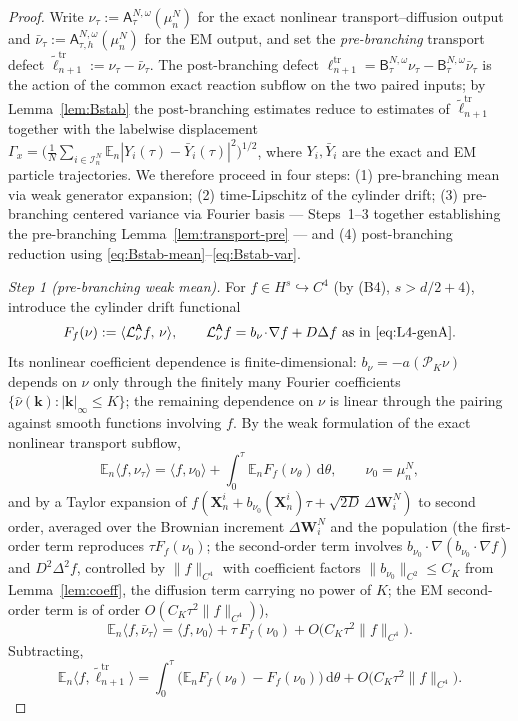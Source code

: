 \documentclass[a4paper,fleqn]{cas-sc}
\theoremstyle{definition}
\theoremstyle{remark}
\begin{document}
\begin{proof}
Write $\nu_\tau:=\mathsf A^{N,\omega}_\tau(\mu^N_n)$ for the exact nonlinear
transport--diffusion output and $\bar\nu_\tau:=\mathsf A^{N,\omega}_{\tau,h}(\mu^N_n)$
for the EM output, and set the \emph{pre-branching} transport defect
$\widetilde\ell^{\mathrm{tr}}_{n+1}:=\nu_\tau-\bar\nu_\tau$. The post-branching defect
$\ell^{\mathrm{tr}}_{n+1}=\mathsf B^{N,\omega}_\tau\nu_\tau
-\mathsf B^{N,\omega}_\tau\bar\nu_\tau$ is the action of the common exact reaction
subflow on the two paired inputs; by Lemma~\ref{lem:Bstab} the post-branching
estimates reduce to estimates of $\widetilde\ell^{\mathrm{tr}}_{n+1}$ together with the
labelwise displacement
$\Gamma_x=\bigl(\frac1N\sum_{i\in\mathcal I^N_n}\mathbb E_n|Y_i(\tau)-\bar Y_i(\tau)|^2\bigr)^{1/2}$,
where $Y_i,\bar Y_i$ are the exact and EM particle trajectories. We therefore
proceed in four steps: (1) pre-branching mean via weak generator expansion;
(2) time-Lipschitz of the cylinder drift; (3) pre-branching centered variance
via Fourier basis --- Steps~1--3 together establishing the pre-branching
Lemma~\ref{lem:transport-pre} --- and (4) post-branching reduction using
\eqref{eq:Bstab-mean}--\eqref{eq:Bstab-var}.

\emph{Step 1 (pre-branching weak mean).} For $f\in H^s\hookrightarrow C^4$ (by
(B4), $s>d/2+4$), introduce the cylinder drift functional
\[
F_f(\nu):=\langle \mathcal L^{\mathsf A}_\nu f,\,\nu\rangle,\qquad
\mathcal L^{\mathsf A}_\nu f=b_\nu\!\cdot\!\nabla f+D\Delta f\ \text{as in~\eqref{eq:L4-genA}.}
\]
Its nonlinear coefficient dependence is finite-dimensional: $b_\nu=-a(\mathcal P_K\nu)$
depends on $\nu$ only through the finitely many Fourier coefficients
$\{\hat\nu(\mathbf k):|\mathbf k|_\infty\le K\}$; the remaining dependence on
$\nu$ is linear through the pairing against smooth functions involving $f$. By
the weak formulation of the exact nonlinear transport subflow,
\[
\mathbb E_n\langle f,\nu_\tau\rangle=\langle f,\nu_0\rangle
+\int_0^\tau\mathbb E_nF_f(\nu_\theta)\,\mathrm d\theta,
\qquad\nu_0=\mu^N_n,
\]
and by a Taylor expansion of $f(\mathbf X^i_n+b_{\nu_0}(\mathbf X^i_n)\tau
+\sqrt{2D}\,\Delta\mathbf W^N_i)$ to second order, averaged over the Brownian
increment $\Delta\mathbf W^N_i$ and the population (the first-order term
reproduces $\tau F_f(\nu_0)$; the second-order term involves
$b_{\nu_0}\!\cdot\!\nabla(b_{\nu_0}\!\cdot\!\nabla f)$ and $D^2\Delta^2 f$,
controlled by $\|f\|_{C^4}$ with coefficient factors $\|b_{\nu_0}\|_{C^2}\le C_K$
from Lemma~\ref{lem:coeff}, the diffusion term carrying no power of $K$; the EM
second-order term is of order $O(C_K\tau^2\|f\|_{C^4})$),
\[
\mathbb E_n\langle f,\bar\nu_\tau\rangle=\langle f,\nu_0\rangle+\tau\,F_f(\nu_0)
+O\bigl(C_K\tau^2\|f\|_{C^4}\bigr).
\]
Subtracting,
\[
\mathbb E_n\langle f,\widetilde\ell^{\mathrm{tr}}_{n+1}\rangle
=\int_0^\tau\bigl(\mathbb E_nF_f(\nu_\theta)-F_f(\nu_0)\bigr)\,\mathrm d\theta
+O\bigl(C_K\tau^2\|f\|_{C^4}\bigr).
\]


\end{proof}
\end{document}

